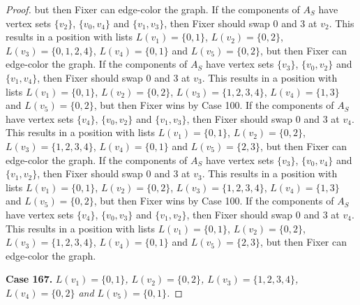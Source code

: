 \documentclass[12pt]{amsart}
\theoremstyle{plain}
\theoremstyle{definition}
\theoremstyle{remark}
\begin{document}
\begin{proof}
but then Fixer can edge-color the graph. If the components of $A_S$ have vertex sets $\{v_2\}$, $\{v_0, v_4\}$ and $\{v_1, v_3\}$, then Fixer should swap 0 and 3 at $v_2$. This results in a position with lists $L(v_1) = \{0, 1\}$, $L(v_2) = \{0, 2\}$, $L(v_3) = \{0, 1, 2, 4\}$, $L(v_4) = \{0, 1\}$ and $L(v_5) = \{0, 2\}$, but then Fixer can edge-color the graph. If the components of $A_S$ have vertex sets $\{v_3\}$, $\{v_0, v_2\}$ and $\{v_1, v_4\}$, then Fixer should swap 0 and 3 at $v_3$. This results in a position with lists $L(v_1) = \{0, 1\}$, $L(v_2) = \{0, 2\}$, $L(v_3) = \{1, 2, 3, 4\}$, $L(v_4) = \{1, 3\}$ and $L(v_5) = \{0, 2\}$, but then Fixer wins by Case 100. If the components of $A_S$ have vertex sets $\{v_4\}$, $\{v_0, v_2\}$ and $\{v_1, v_3\}$, then Fixer should swap 0 and 3 at $v_4$. This results in a position with lists $L(v_1) = \{0, 1\}$, $L(v_2) = \{0, 2\}$, $L(v_3) = \{1, 2, 3, 4\}$, $L(v_4) = \{0, 1\}$ and $L(v_5) = \{2, 3\}$, but then Fixer can edge-color the graph. If the components of $A_S$ have vertex sets $\{v_3\}$, $\{v_0, v_4\}$ and $\{v_1, v_2\}$, then Fixer should swap 0 and 3 at $v_3$. This results in a position with lists $L(v_1) = \{0, 1\}$, $L(v_2) = \{0, 2\}$, $L(v_3) = \{1, 2, 3, 4\}$, $L(v_4) = \{1, 3\}$ and $L(v_5) = \{0, 2\}$, but then Fixer wins by Case 100. If the components of $A_S$ have vertex sets $\{v_4\}$, $\{v_0, v_3\}$ and $\{v_1, v_2\}$, then Fixer should swap 0 and 3 at $v_4$. This results in a position with lists $L(v_1) = \{0, 1\}$, $L(v_2) = \{0, 2\}$, $L(v_3) = \{1, 2, 3, 4\}$, $L(v_4) = \{0, 1\}$ and $L(v_5) = \{2, 3\}$, but then Fixer can edge-color the graph. 

\noindent\textbf{Case 167.  }\textit{$L(v_1) = \{0, 1\}$, $L(v_2) = \{0, 2\}$, $L(v_3) = \{1, 2, 3, 4\}$, $L(v_4) = \{0, 2\}$ and $L(v_5) = \{0, 1\}$.}


\end{proof}
\end{document}
